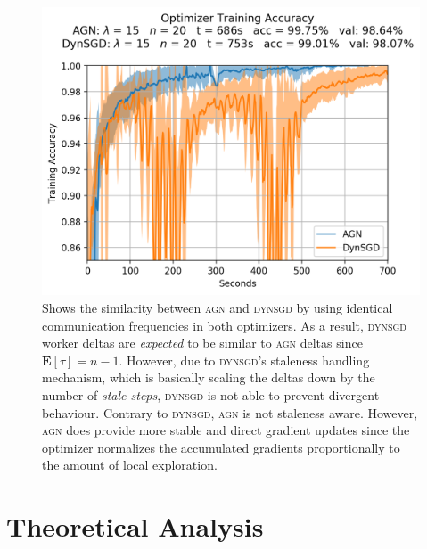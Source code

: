 \begin{figure}[H]
  \centering
  \includegraphics[width=.6\textwidth]{resources/images/agn_experiment_3}
  \caption{Shows the similarity between \textsc{agn} and \textsc{dynsgd} by using identical communication frequencies in both optimizers. As a result, \textsc{dynsgd} worker deltas are \emph{expected} to be similar to \textsc{agn} deltas since $\textbf{E}[\tau] = n - 1$. However, due to \textsc{dynsgd}'s staleness handling mechanism, which is basically scaling the deltas down by the number of \emph{stale steps}, \textsc{dynsgd} is not able to prevent divergent behaviour. Contrary to \textsc{dynsgd}, \textsc{agn} is not staleness aware. However, \textsc{agn} does provide more stable and direct gradient updates since the optimizer normalizes the accumulated gradients proportionally to the amount of local exploration.}
  \label{fig:agn_experiment_2}
\end{figure}

\section{Theoretical Analysis}
\label{sec:agn_theoretical_analysis}
